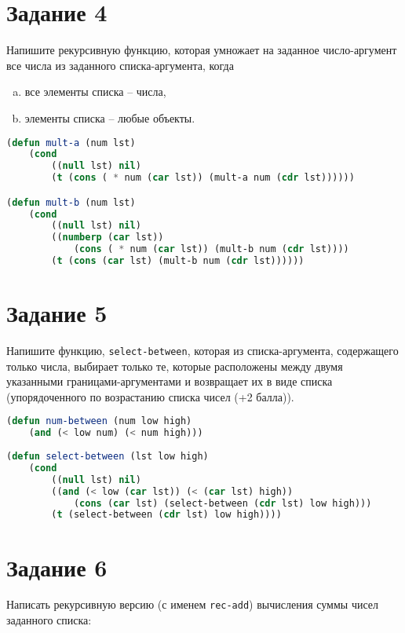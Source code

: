 \section{Задание 4}

Напишите рекурсивную функцию, которая умножает на заданное число-аргумент все
числа из заданного списка-аргумента, когда

\begin{enumerate}[a)]
	\item все элементы списка -- числа,
	\item элементы списка -- любые объекты.
\end{enumerate}

\begin{lstlisting}[language=Lisp]
(defun mult-a (num lst)
	(cond
		((null lst) nil)
		(t (cons ( * num (car lst)) (mult-a num (cdr lst))))))

(defun mult-b (num lst)
	(cond
		((null lst) nil)
		((numberp (car lst))
			(cons ( * num (car lst)) (mult-b num (cdr lst))))
		(t (cons (car lst) (mult-b num (cdr lst))))))
\end{lstlisting}

\section{Задание 5}

Напишите функцию, \texttt{select-between}, которая из списка-аргумента, содержащего только числа, выбирает только те, которые расположены между двумя указанными границами-аргументами и возвращает их в виде списка (упорядоченного по возрастанию списка чисел
(+2 балла)).

\begin{lstlisting}[language=Lisp]
(defun num-between (num low high)
	(and (< low num) (< num high)))
	
(defun select-between (lst low high)
	(cond
		((null lst) nil)
		((and (< low (car lst)) (< (car lst) high))
			(cons (car lst) (select-between (cdr lst) low high)))
		(t (select-between (cdr lst) low high))))
\end{lstlisting}

\clearpage

\section{Задание 6}

Написать рекурсивную версию (с именем \texttt{rec-add}) вычисления суммы чисел заданного списка:

